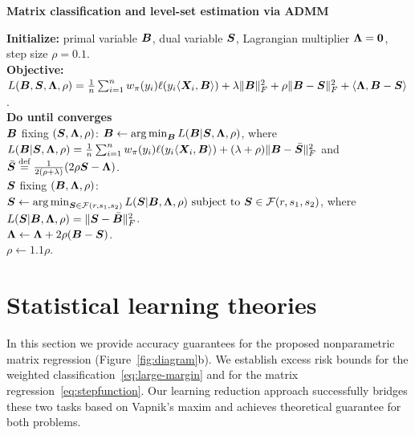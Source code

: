 \documentclass[11pt]{article}
\theoremstyle{definition}
\begin{document}
 \begin{algorithm}[h]
  \caption{{\bf Matrix classification and level-set estimation via ADMM} } \label{alg:weighted}
{\bf Initialize:} primal variable $\bm B$, dual variable $\bm S$, Lagrangian multiplier $\bm{\Lambda}=\mathbf{0}$, step size $\rho=0.1$.\\[.1cm]
{\bf Objective: } $
L(\bm B,\bm S,\bm{\Lambda},\rho)={1\over n}\sum_{i=1}^nw_\pi(y_i)\ell(y_i\langle \bm X_i,\bm B \rangle) + \lambda\lVert\bm B\rVert_F^2+\rho\lVert\bm B-\bm S\rVert_F^2+\langle \bm{\Lambda}, \bm B-\bm S\rangle$.\\[.1cm]
{\bf Do until converges}\\[.1cm]
\hspace*{.2cm}{\bf Update} $\bm B$ fixing $(\bm S,\bm{\Lambda},\rho)$: 
$\bm B \leftarrow \operatorname*{arg\,min}_{\bm B} L(\bm B|\bm S,\bm{\Lambda},\rho)$, where $L(\bm B|\bm S,\bm{\Lambda},\rho)={1\over n}\sum_{i=1}^n w_\pi(y_i)\ell(y_i\langle\bm X_i,\bm B\rangle)+(\lambda+\rho)\lVert\bm B-\bar {\bm S}\rVert_F^2$ and $\bar {\bm S}\stackrel{\text{def}}{=}{1\over 2(\rho+\lambda)}(2\rho\bm S-\bm{\Lambda})$. \\[.1cm]

\hspace*{.2cm}{\bf Update} $\bm S$ fixing $(\bm B,\bm{\Lambda},\rho)$: $\bm S \leftarrow  \operatorname*{arg\,min}_{\bm S\in \mathcal{F}(r,s_1,s_2)}L(\bm S|\bm B,\bm{\Lambda},\rho) \ \text{subject to }\bm S\in\mathcal{F}(r,s_1,s_2)$, where $ L(\bm S|\bm B,\bm{\Lambda},\rho)=\lVert\bm S-\bar {\bm B}\rVert_F^2$.\\[.1cm]
\hspace*{.2cm}{\bf Update} $\bm{\Lambda} \leftarrow \bm{\Lambda}+2\rho(\bm B-\bm S)$.\\[.1cm]
 \hspace*{.2cm}{\bf Update} $\rho\leftarrow1.1\rho$.\\[.1cm]
\end{algorithm}


\vspace{-.3cm}
\section{Statistical learning theories}\label{sec:theory}
\vspace{-.5cm}
In this section we provide accuracy guarantees for the proposed nonparametric matrix regression (Figure~\ref{fig:diagram}b). We establish excess risk bounds for the weighted classification~\eqref{eq:large-margin} and for the matrix regression~\eqref{eq:stepfunction}. Our learning reduction approach successfully bridges these two tasks based on Vapnik’s maxim and achieves theoretical guarantee for both problems. 
\end{document}
